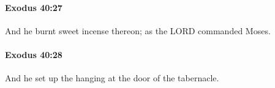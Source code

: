 		\paragraph{Exodus 40:27} %
			\label{EXODUS-40-27}

			And he burnt sweet incense thereon; as the LORD commanded Moses.


		\paragraph{Exodus 40:28} %
			\label{EXODUS-40-28}

			And he set up the hanging at the door of the tabernacle.


